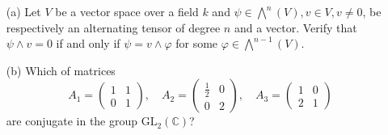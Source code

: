 \documentclass[openany]{book}
\begin{document}
\begin{prob}
    \begin{itemize}
        \item[(a)] Let \(V\) be a vector space over a field \(k\) and \(\psi \in \bigwedge^{n}(V), v \in V, v \neq 0\), be respectively an alternating tensor of degree \(n\) and a vector. Verify that \(\psi \land v = 0\) if and only if \(\psi = v \land \varphi\) for some \(\varphi \in \bigwedge^{n-1}(V)\).
        
        \item[(b)] Which of matrices 
        \[A_{1} = \begin{pmatrix} 1 & 1 \\ 0 & 1 \end{pmatrix}, \quad A_{2} = \begin{pmatrix} \frac{1}{2} & 0 \\ 0 & 2 \end{pmatrix}, \quad A_{3} = \begin{pmatrix} 1 & 0 \\ 2 & 1 \end{pmatrix}\] 
        are conjugate in the group \(\text{GL}_{2}(\mathbb{C})\)?
    \end{itemize}
\end{prob}
\end{document}
